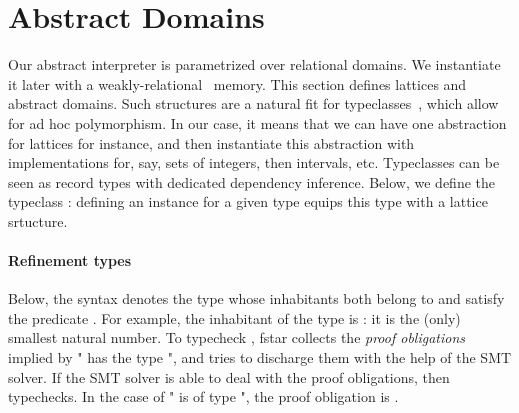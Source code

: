\documentclass{llncs}
\begin{document}
\section{Abstract Domains}
\label{abint:section:abstract-domains}
%
Our abstract interpreter is parametrized over relational domains.
%
We instantiate it later with a weakly-relational~\cite{astree}
memory.
%
This section defines lattices and abstract domains.
%
Such structures are a natural fit for typeclasses~\cite{metafstar},
which allow for ad hoc polymorphism.
%
In our case, it means that we can have one abstraction for
lattices for instance, and then instantiate this abstraction with
implementations for, say, sets of integers, then intervals, etc.
%
Typeclasses can be seen as record types with dedicated dependency
inference.
%
Below, we define the typeclass : defining an
instance for a given type equips this type with a lattice
srtucture.
%
\paragraph{Refinement types}
%
Below, the syntax  denotes the type whose
inhabitants both belong to  and satisfy the predicate
.
%
For example, the inhabitant of the type
%
 is : it is the
(only) smallest natural number.
%
To typecheck , \gls{fstar} collects the \textit{proof
obligations} implied by " has the type ", and
tries to discharge them with the help of the SMT solver.
%
If the SMT solver is able to deal with the proof obligations, then
 typechecks.
%
In the case of " is of type
", the proof obligation
is .
\end{document}
